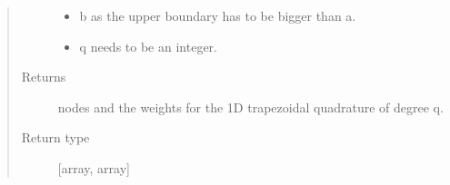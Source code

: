 \documentclass[letterpaper,10pt,english]{sphinxmanual}
\begin{document}
\begin{fulllineitems}
\begin{quote}
\begin{description}
\begin{itemize}
\item {} 
 \textendash{} b as the upper boundary has to be bigger than a.

\item {} 
 \textendash{} q needs to be an integer.

\end{itemize}

\item[{Returns}] \leavevmode
nodes and the weights for the 1D trapezoidal quadrature of degree q.

\item[{Return type}] \leavevmode
{[}array, array{]}

\end{description}\end{quote}

\end{fulllineitems}

\end{document}
